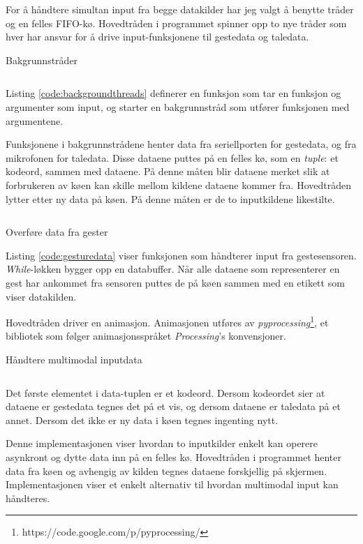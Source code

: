 For å håndtere simultan input fra begge datakilder har jeg valgt å benytte tråder og en felles FIFO-kø. Hovedtråden i programmet spinner opp to nye tråder som hver har ansvar for å drive input-funksjonene til gestedata og taledata. 
\begin{listing}[ht]
\caption{Bakgrunnstråder}
\inputminted[fontsize=\footnotesize, linenos]{python}{kodesnutter/background_threads.py}
\label{code:backgroundthreads}
\end{listing}
Listing \ref{code:backgroundthreads} definerer en funksjon som tar en funksjon og argumenter som input, og starter en bakgrunnstråd som utfører funksjonen med argumentene.

Funksjonene i bakgrunnstrådene henter data fra seriellporten for gestedata, og fra mikrofonen for taledata. Disse dataene puttes på en felles kø, som en \emph{tuple}: et kodeord, sammen med dataene. På denne måten blir dataene merket slik at forbrukeren av køen kan skille mellom kildene dataene kommer fra. Hovedtråden lytter etter ny data på køen. På denne måten er de to inputkildene likestilte. 
\begin{listing}[ht]
\inputminted[fontsize=\footnotesize, linenos]{python}{kodesnutter/gesture_data.py}
\label{code:gesturedata}
\caption{Overføre data fra gester}
\end{listing}
Listing \ref{code:gesturedata} viser funksjonen som håndterer input fra gestesensoren. \emph{While}-løkken bygger opp en databuffer. Når alle dataene som representerer en gest har ankommet fra sensoren puttes de på køen sammen med en etikett som viser datakilden.

Hovedtråden driver en animasjon. Animasjonen utføres av \emph{pyprocessing}\footnote{https://code.google.com/p/pyprocessing/}, et bibliotek som følger animasjonsspråket \emph{Processing}'s konvensjoner.
\begin{listing}[ht]
\caption{Håndtere multimodal inputdata}
\inputminted[fontsize=\footnotesize, linenos]{python}{kodesnutter/multimodal.py}
\label{code:multimodal}
\end{listing}
Det første elementet i data-tuplen er et kodeord. Dersom kodeordet sier at dataene er gestedata tegnes det på et vis, og dersom dataene er taledata på et annet. Dersom det ikke er ny data i køen tegnes ingenting nytt.

Denne implementasjonen viser hvordan to inputkilder enkelt kan operere asynkront og dytte data inn på en felles kø. Hovedtråden i programmet henter data fra køen og avhengig av kilden tegnes dataene forskjellig på skjermen. Implementasjonen viser et enkelt alternativ til hvordan multimodal input kan håndteres.

